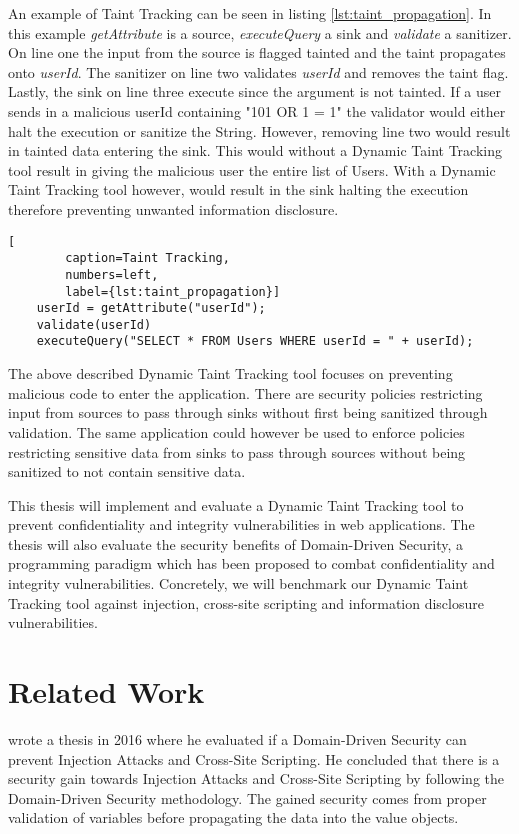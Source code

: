 \documentclass{../kththesis}
\begin{document}
	An example of Taint Tracking can be seen in listing \ref{lst:taint_propagation}. In this example \textit{getAttribute} is a source, \textit{executeQuery} a sink and \textit{validate} a sanitizer. On line one the input from the source is flagged tainted and the taint propagates onto \textit{userId}. The sanitizer on line two validates \textit{userId} and removes the taint flag. Lastly, the sink on line three execute since the argument is not tainted. If a user sends in a malicious userId containing "101 OR 1 = 1" the validator would either halt the execution or sanitize the String. However, removing line two would result in tainted data entering the sink. This would without a Dynamic Taint Tracking tool result in giving the malicious user the entire list of Users. With a Dynamic Taint Tracking tool however, would result in the sink halting the execution therefore preventing unwanted information disclosure.
	
	\begin{lstlisting}[
		caption=Taint Tracking,
		numbers=left,
		label={lst:taint_propagation}]
	userId = getAttribute("userId");
	validate(userId)
	executeQuery("SELECT * FROM Users WHERE userId = " + userId);
	\end{lstlisting}
	
	The above described Dynamic Taint Tracking tool focuses on preventing malicious code to enter the application. There are security policies restricting input from sources to pass through sinks without first being sanitized through validation. The same application could however be used to enforce policies restricting sensitive data from sinks to pass through sources without being sanitized to not contain sensitive data. 
	
	This thesis will implement and evaluate a Dynamic Taint Tracking tool to prevent confidentiality and integrity vulnerabilities in web applications. The thesis will also evaluate the security benefits of Domain-Driven Security, a programming paradigm which has been proposed to combat confidentiality and integrity vulnerabilities. Concretely, we will benchmark our Dynamic Taint Tracking tool against injection, cross-site scripting and information disclosure vulnerabilities.
	
	
	\section{Related Work}
	\textcite{Stendahl2016} wrote a thesis in 2016 where he evaluated if a Domain-Driven Security can prevent Injection Attacks and Cross-Site Scripting. He concluded that there is a security gain towards Injection Attacks and Cross-Site Scripting by following the Domain-Driven Security methodology. The gained security comes from proper validation of variables before propagating the data into the value objects.
	
\end{document}
